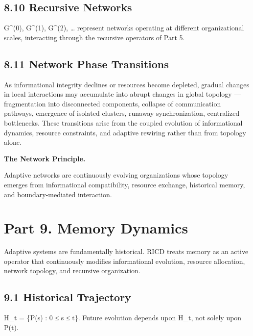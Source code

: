 \documentclass[
]{article}
\begin{document}
\hypertarget{recursive-networks}{%
\subsection{8.10 Recursive Networks}\label{recursive-networks}}

G\^{}(0), G\^{}(1), G\^{}(2), \ldots{} represent networks operating at
different organizational scales, interacting through the recursive
operators of Part 5.

\hypertarget{network-phase-transitions}{%
\subsection{8.11 Network Phase
Transitions}\label{network-phase-transitions}}

As informational integrity declines or resources become depleted,
gradual changes in local interactions may accumulate into abrupt changes
in global topology --- fragmentation into disconnected components,
collapse of communication pathways, emergence of isolated clusters,
runaway synchronization, centralized bottlenecks. These transitions
arise from the coupled evolution of informational dynamics, resource
constraints, and adaptive rewiring rather than from topology alone.

\textbf{The Network Principle.}

Adaptive networks are continuously evolving organizations whose topology
emerges from informational compatibility, resource exchange, historical
memory, and boundary-mediated interaction.

\hypertarget{part-9.-memory-dynamics}{%
\section{Part 9. Memory Dynamics}\label{part-9.-memory-dynamics}}

Adaptive systems are fundamentally historical. RICD treats memory as an
active operator that continuously modifies informational evolution,
resource allocation, network topology, and recursive organization.

\hypertarget{historical-trajectory}{%
\subsection{9.1 Historical Trajectory}\label{historical-trajectory}}

H\_t = \{P(s) : 0 ≤ s ≤ t\}. Future evolution depends upon H\_t, not
solely upon P(t).
\end{document}
